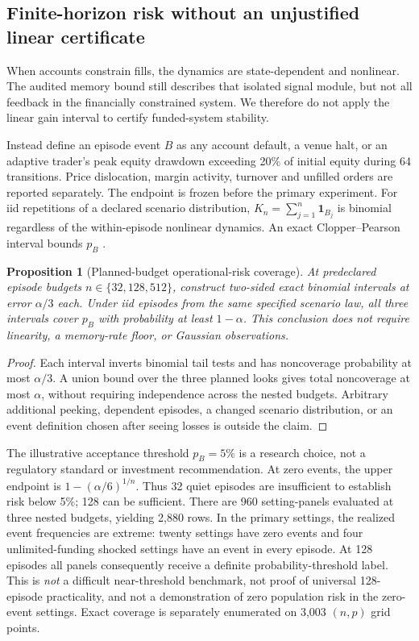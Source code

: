 \documentclass[11pt,a4paper]{article}
\newtheorem{proposition}[theorem]{Proposition}
\theoremstyle{definition}
\theoremstyle{remark}
\begin{document}
\subsection{Finite-horizon risk without an unjustified linear certificate}
When accounts constrain fills, the dynamics are state-dependent and nonlinear. The audited memory bound still describes that isolated signal module, but not all feedback in the financially constrained system. We therefore do not apply the linear gain interval to certify funded-system stability.

Instead define an episode event $B$ as any account default, a venue halt, or an adaptive trader's peak equity drawdown exceeding 20\% of initial equity during 64 transitions. Price dislocation, margin activity, turnover and unfilled orders are reported separately. The endpoint is frozen before the primary experiment. For iid repetitions of a declared scenario distribution, $K_n=\sum_{j=1}^n\mathbf{1}_{B_j}$ is binomial regardless of the within-episode nonlinear dynamics. An exact Clopper--Pearson interval bounds $p_B$ \citep{clopper1934}.

\begin{proposition}[Planned-budget operational-risk coverage]
At predeclared episode budgets $n\in\{32,128,512\}$, construct two-sided exact binomial intervals at error $\alpha/3$ each. Under iid episodes from the same specified scenario law, all three intervals cover $p_B$ with probability at least $1-\alpha$. This conclusion does not require linearity, a memory-rate floor, or Gaussian observations.
\end{proposition}
\begin{proof}
Each interval inverts binomial tail tests and has noncoverage probability at most $\alpha/3$. A union bound over the three planned looks gives total noncoverage at most $\alpha$, without requiring independence across the nested budgets. Arbitrary additional peeking, dependent episodes, a changed scenario distribution, or an event definition chosen after seeing losses is outside the claim.
\end{proof}

The illustrative acceptance threshold $p_B=5\%$ is a research choice, not a regulatory standard or investment recommendation. At zero events, the upper endpoint is $1-(\alpha/6)^{1/n}$. Thus 32 quiet episodes are insufficient to establish risk below 5\%; 128 can be sufficient. There are 960 setting-panels evaluated at three nested budgets, yielding 2,880 rows. In the primary settings, the realized event frequencies are extreme: twenty settings have zero events and four unlimited-funding shocked settings have an event in every episode. At 128 episodes all panels consequently receive a definite probability-threshold label. This is \emph{not} a difficult near-threshold benchmark, not proof of universal 128-episode practicality, and not a demonstration of zero population risk in the zero-event settings. Exact coverage is separately enumerated on 3,003 $(n,p)$ grid points.
\end{document}
